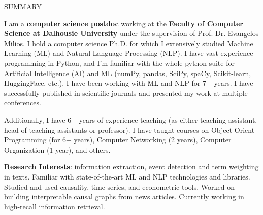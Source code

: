 \documentclass{resume} %
\begin{document}

\vspace{-0.2cm}
\begin{rSection}{SUMMARY}
\vspace{-0.1cm}
\item {I am a \textbf{computer science postdoc} working at the \textbf{Faculty of Computer Science at Dalhousie University} under the supervision of Prof. Dr. Evangelos Milios. I hold a computer science Ph.D. for which I extensively studied Machine Learning (ML) and Natural Language Processing (NLP). I have vast experience programming in Python, and I'm familiar with the whole python suite for Artificial Intelligence (AI) and ML (numPy, pandas, SciPy, spaCy, Scikit-learn, HuggingFace, etc.). I have been working with ML and NLP for 7+ years. I have successfully published in scientific journals and presented my work at multiple conferences. 
\smallskip

\item Additionally, I have 6+ years of experience teaching (as either teaching assistant, head of teaching assistants or professor). I have taught courses on Object Orient Programming (for 6+ years), Computer Networking (2 years), Computer Organization (1 year), and others. 
\smallskip


 \item \textbf{Research Interests}: information extraction, event detection and term weighting in texts. Familiar with state-of-the-art ML and NLP technologies and libraries. Studied and used causality, time series, and econometric tools. Worked on building interpretable causal graphs from news articles. 
Currently working in high-recall information retrieval.
}


\end{rSection}
\end{document}
